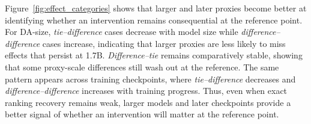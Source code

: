Figure~\ref{fig:effect_categories} shows that larger and later proxies become better at identifying whether an intervention remains consequential at the reference point. For DA-size, \emph{tie--difference} cases decrease with model size while \emph{difference--difference} cases increase, indicating that larger proxies are less likely to miss effects that persist at 1.7B. \emph{Difference--tie} remains comparatively stable, showing that some proxy-scale differences still wash out at the reference. The same pattern appears across training checkpoints, where \emph{tie--difference} decreases and \emph{difference--difference} increases with training progress. Thus, even when exact ranking recovery remains weak, larger models and later checkpoints provide a better signal of whether an intervention will matter at the reference point.
